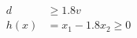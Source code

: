\documentclass[preview]{standalone}
\begin{document}
\begin{align*}
d &\geq 1.8 v\\ h(x) &= x_1 - 1.8 x_2 \geq 0
\end{align*}
\end{document}
